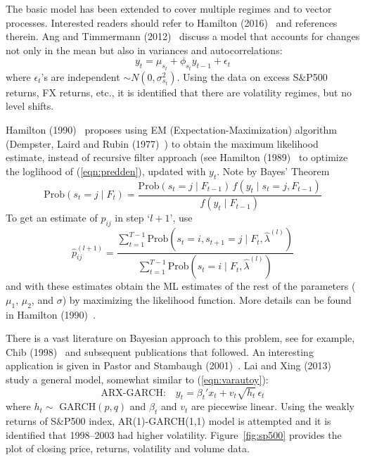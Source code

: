 The basic model has been extended to cover multiple regimes and to vector processes. Interested readers should refer to Hamilton (2016)~\cite{jdham} and references therein. Ang and Timmermann (2012)~\cite{timmerman} discuss a model that accounts for changes not only in the mean but also in variances and autocorrelations:
	\begin{equation}\label{eqn:varautoy}
	y_t= \mu_{s_t} + \phi_{s_t} y_{t-1} + \epsilon_t
	\end{equation}
where $\epsilon_t$'s are independent $\sim N(0,\sigma_{s_t}^2)$. Using the data on excess S\&P500 returns, FX returns, etc., it is identified that there are volatility regimes, but no level shifts.


Hamilton (1990)~\cite{90ham} proposes using EM (Expectation-Maximization) algorithm (Dempster, Laird and Rubin (1977)~\cite{dempster}) to obtain the maximum likelihood estimate, instead of recursive filter approach (see Hamilton (1989)~\cite{89ham} to optimize the loglihood of (\ref{eqn:predden}), updated with $y_t$. Note by Bayes' Theorem
	\begin{equation}\label{eqn:bayes}
	\text{Prob}(s_t=j \;|\; F_t) = \dfrac{\text{Prob}(s_t=j \;|\; F_{t-1}) \, f(y_t\;|\; s_t=j, F_{t-1})}{f(y_t \;|\; F_{t-1})}
	\end{equation}
To get an estimate of $p_{ij}$ in step `$l+1$', use 
	\begin{equation}\label{eqn:hatpijl}
	\hat{p}_{ij}^{(l+1)}= \dfrac{\sum_{t=1}^{T-1} \text{Prob}(s_t=i, s_{t+1}=j \;|\; F_t, \hat{\lambda}^{(l)})}{\sum_{t=1}^{T-1} \text{Prob}(s_t=i \;|\; F_t, \hat{\lambda}^{(l)})}
	\end{equation}
and with these estimates obtain the ML estimates of the rest of the parameters ($\mu_1$, $\mu_2$, and $\sigma$) by maximizing the likelihood function. More details can be found in Hamilton (1990)~\cite{90ham}.


There is a vast literature on Bayesian approach to this problem, see for example, Chib (1998)~\cite{chib} and subsequent publications that followed. An interesting application is given in Pastor and Stambaugh (2001)~\cite{pastor}. Lai and Xing (2013)~\cite{laixing} study a general model, somewhat similar to (\ref{eqn:varautoy}):
	\begin{equation}\label{eqn:arxgarch}
	\text{ARX-GARCH:} \quad y_t= \beta_t' x_t + v_t \sqrt{h_t} \, \epsilon_t
	\end{equation}
where $h_t\sim$ GARCH$(p,q)$ and $\beta_t$ and $v_t$ are piecewise linear. Using the weakly returns of S\&P500 index, AR(1)-GARCH(1,1) model is attempted and it is identified that 1998--2003 had higher volatility. Figure~\ref{fig:sp500} provides the plot of closing price, returns, volatility and volume data. 


